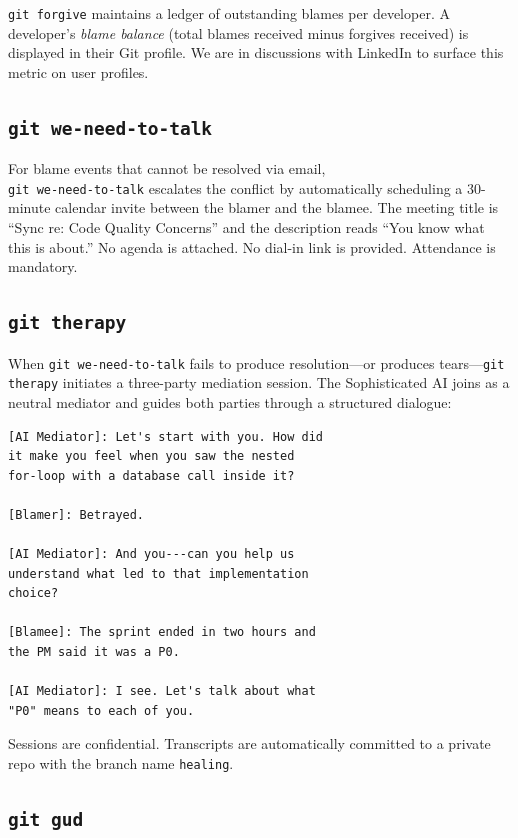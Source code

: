 \documentclass{sigtbd}
\begin{document}
\texttt{git forgive} maintains a ledger of outstanding blames per developer. A developer's \emph{blame balance} (total blames received minus forgives received) is displayed in their Git profile. We are in discussions with LinkedIn to surface this metric on user profiles.

\subsection{\texttt{git we-need-to-talk}}

For blame events that cannot be resolved via email, \\ \texttt{git we-need-to-talk} escalates the conflict by automatically scheduling a 30-minute calendar invite between the blamer and the blamee. The meeting title is ``Sync re: Code Quality Concerns'' and the description reads ``You know what this is about.'' No agenda is attached. No dial-in link is provided. Attendance is mandatory.

\subsection{\texttt{git therapy}}

When \texttt{git we-need-to-talk} fails to produce resolution---or produces tears---\texttt{git therapy} initiates a three-party mediation session. The Sophisticated AI\texttrademark{} joins as a neutral mediator and guides both parties through a structured dialogue:

\begin{lstlisting}
[AI Mediator]: Let's start with you. How did
it make you feel when you saw the nested
for-loop with a database call inside it?

[Blamer]: Betrayed.

[AI Mediator]: And you---can you help us
understand what led to that implementation
choice?

[Blamee]: The sprint ended in two hours and
the PM said it was a P0.

[AI Mediator]: I see. Let's talk about what
"P0" means to each of you.
\end{lstlisting}

Sessions are confidential. Transcripts are automatically committed to a private repo with the branch name \texttt{healing}.

\subsection{\texttt{git gud}}
\end{document}
